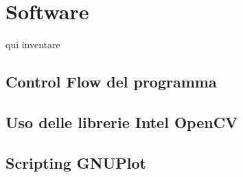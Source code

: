 
\chapter{Software}
qui inventare
\section{Control Flow del programma}
\section{Uso delle librerie Intel OpenCV}
\section{Scripting GNUPlot}

